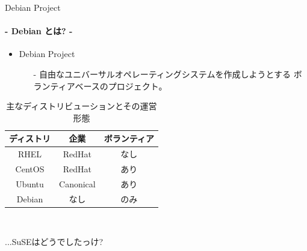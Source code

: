 \documentclass[cjk,dvipdfmx,14pt,compress,fragile]{beamer}
\newcommand{\textsmall}[1]{{\small{#1}}}
\begin{document}
\begin{frame}[c,fragile]{Debian Project}
  \framesubtitle{- Debian とは? -}
  \begin{itemize}
  \item %
    Debian Project
    \begin{itemize}
    \item[-]
      \alert{自由}な\alert{ユニバーサル}オペレーティングシステムを作成しようとする
      ボランティアベースのプロジェクト。
    \end{itemize}
  \end{itemize}
  \vspace{-1em}
  \textsmall{%
    \begin{table}[htb]
      \centering
      \caption{主なディストリビューションとその運営形態}
      \begin{tabular}{|c|c|c|}
        \hline
        ディストリ     & 企業         & ボランティア \\ \hline
        RHEL           & RedHat       & なし         \\ \hline
        CentOS         & RedHat       & あり         \\ \hline
        Ubuntu         & Canonical    & あり         \\ \hline
        \alert{Debian} & \alert{なし} & \alert{のみ} \\ \hline
      \end{tabular}\\
    \end{table}
    ...SuSEはどうでしたっけ?
  }
\end{frame}
\end{document}
